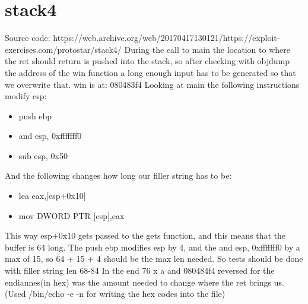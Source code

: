 \documentclass[11pt,a4paper]{article}
\begin{document}
\section*{stack4}
\markright{}
Source code:\newline
https://web.archive.org/web/20170417130121/https://exploit-exercises.com/protostar/stack4/\newline
During the call to main the location to where the ret should return is pushed into the stack, so after checking with objdump the address of the win function a long enough input has to be generated so that we overwrite that.\newline
win is at: 080483f4\newline
Looking at main the following instructions modify esp:\newline
\begin{itemize}
\item push ebp
\item and esp, 0xfffffff0
\item sub esp, 0x50
\end{itemize}
And the following changes how long our filler string has to be:
\begin{itemize}
\item lea eax,[esp+0x10]
\item mov DWORD PTR [esp],eax
\end{itemize}
This way esp+0x10 gets passed to the gets function, and this means that the buffer is 64 long.\newline
The push ebp modifies esp by 4, and the and esp, 0xfffffff0 by a max of 15, so 64 + 15 + 4 should be the max len needed.\newline
So tests should be done with filler string len 68-84\newline
In the end 76 x a and 080484f4 reversed for the endiannes(in hex) was the amount needed to change where the ret brings us.\newline
(Used /bin/echo -e -n for writing the hex codes into the file)
\end{document}
